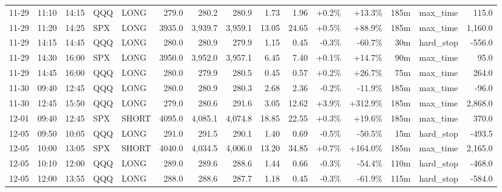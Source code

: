 \documentclass[11pt,a4paper,twoside]{article}
\begin{document}
\begin{landscape}
\begin{center}
\begin{longtable}{>{\color{txtmain}}l l l l l r r r r r r r r >{\color{txtmain}}l r}
11-29 & 11:10 & 14:15 & QQQ & LONG & 279.0 & 280.2 & 280.9 & 1.73 & 1.96 & \textcolor{wingreen}{+0.2\%} & \textcolor{wingreen}{+13.3\%} & 185m & max\_time & \textcolor{wingreen}{115.0} \\
11-29 & 11:20 & 14:25 & SPX & LONG & 3935.0 & 3,939.7 & 3,959.1 & 13.05 & 24.65 & \textcolor{wingreen}{+0.5\%} & \textcolor{wingreen}{+88.9\%} & 185m & max\_time & \textcolor{wingreen}{1,160.0} \\
11-29 & 14:15 & 14:45 & QQQ & LONG & 280.0 & 280.9 & 279.9 & 1.15 & 0.45 & \textcolor{lossred}{-0.3\%} & \textcolor{lossred}{-60.7\%} & 30m & hard\_stop & \textcolor{lossred}{-556.0} \\
11-29 & 14:30 & 16:00 & SPX & LONG & 3950.0 & 3,952.0 & 3,957.1 & 6.45 & 7.40 & \textcolor{wingreen}{+0.1\%} & \textcolor{wingreen}{+14.7\%} & 90m & max\_time & \textcolor{wingreen}{95.0} \\
11-29 & 14:45 & 16:00 & QQQ & LONG & 280.0 & 279.9 & 280.5 & 0.45 & 0.57 & \textcolor{wingreen}{+0.2\%} & \textcolor{wingreen}{+26.7\%} & 75m & max\_time & \textcolor{wingreen}{264.0} \\
11-30 & 09:40 & 12:45 & QQQ & LONG & 280.0 & 280.9 & 280.3 & 2.68 & 2.36 & \textcolor{lossred}{-0.2\%} & \textcolor{lossred}{-11.9\%} & 185m & max\_time & \textcolor{lossred}{-96.0} \\
11-30 & 12:45 & 15:50 & QQQ & LONG & 279.0 & 280.6 & 291.6 & 3.05 & 12.62 & \textcolor{wingreen}{+3.9\%} & \textcolor{wingreen}{+312.9\%} & 185m & max\_time & \textcolor{wingreen}{2,868.0} \\
12-01 & 09:40 & 12:45 & SPX & SHORT & 4095.0 & 4,085.1 & 4,074.8 & 18.85 & 22.55 & \textcolor{wingreen}{+0.3\%} & \textcolor{wingreen}{+19.6\%} & 185m & max\_time & \textcolor{wingreen}{370.0} \\
12-05 & 09:50 & 10:05 & QQQ & LONG & 291.0 & 291.5 & 290.1 & 1.40 & 0.69 & \textcolor{lossred}{-0.5\%} & \textcolor{lossred}{-50.5\%} & 15m & hard\_stop & \textcolor{lossred}{-493.5} \\
12-05 & 10:00 & 13:05 & SPX & SHORT & 4040.0 & 4,034.5 & 4,006.0 & 13.20 & 34.85 & \textcolor{wingreen}{+0.7\%} & \textcolor{wingreen}{+164.0\%} & 185m & max\_time & \textcolor{wingreen}{2,165.0} \\
12-05 & 10:10 & 12:00 & QQQ & LONG & 289.0 & 289.6 & 288.6 & 1.44 & 0.66 & \textcolor{lossred}{-0.3\%} & \textcolor{lossred}{-54.4\%} & 110m & hard\_stop & \textcolor{lossred}{-468.0} \\
12-05 & 12:00 & 13:55 & QQQ & LONG & 288.0 & 288.6 & 287.7 & 1.18 & 0.45 & \textcolor{lossred}{-0.3\%} & \textcolor{lossred}{-61.9\%} & 115m & hard\_stop & \textcolor{lossred}{-584.0} \\

\end{longtable}
\end{center}
\end{landscape}
\end{document}

